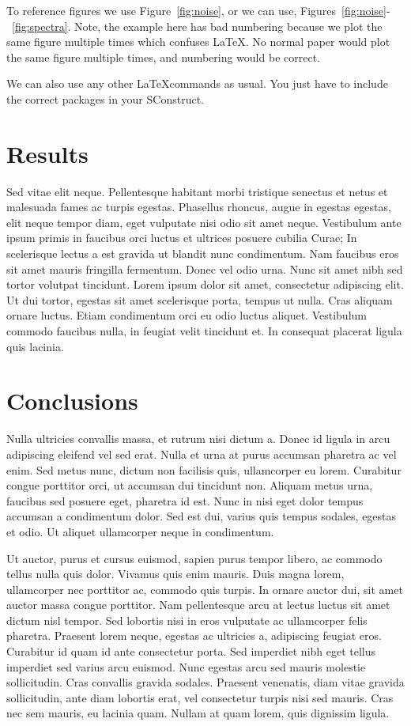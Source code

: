 To reference figures we use Figure~\ref{fig:noise}, or we can use, Figures~\ref{fig:noise}-~\ref{fig:spectra}. Note, the example here has bad numbering because we plot the same figure multiple times which confuses \LaTeX.  No normal paper would plot the same figure multiple times, and numbering would be correct.

We can also use any other \LaTeX commands as usual.  You just have to include the correct packages in your SConstruct.

\section{Results}

Sed vitae elit neque. Pellentesque habitant morbi tristique senectus et netus et malesuada fames ac turpis egestas. Phasellus rhoncus, augue in egestas egestas, elit neque tempor diam, eget vulputate nisi odio sit amet neque. Vestibulum ante ipsum primis in faucibus orci luctus et ultrices posuere cubilia Curae; In scelerisque lectus a est gravida ut blandit nunc condimentum. Nam faucibus eros sit amet mauris fringilla fermentum. Donec vel odio urna. Nunc sit amet nibh sed tortor volutpat tincidunt. Lorem ipsum dolor sit amet, consectetur adipiscing elit. Ut dui tortor, egestas sit amet scelerisque porta, tempus ut nulla. Cras aliquam ornare luctus. Etiam condimentum orci eu odio luctus aliquet. Vestibulum commodo faucibus nulla, in feugiat velit tincidunt et. In consequat placerat ligula quis lacinia.

\section{Conclusions}

Nulla ultricies convallis massa, et rutrum nisi dictum a. Donec id ligula in arcu adipiscing eleifend vel sed erat. Nulla et urna at purus accumsan pharetra ac vel enim. Sed metus nunc, dictum non facilisis quis, ullamcorper eu lorem. Curabitur congue porttitor orci, ut accumsan dui tincidunt non. Aliquam metus urna, faucibus sed posuere eget, pharetra id est. Nunc in nisi eget dolor tempus accumsan a condimentum dolor. Sed est dui, varius quis tempus sodales, egestas et odio. Ut aliquet ullamcorper neque in condimentum.

Ut auctor, purus et cursus euismod, sapien purus tempor libero, ac commodo tellus nulla quis dolor. Vivamus quis enim mauris. Duis magna lorem, ullamcorper nec porttitor ac, commodo quis turpis. In ornare auctor dui, sit amet auctor massa congue porttitor. Nam pellentesque arcu at lectus luctus sit amet dictum nisl tempor. Sed lobortis nisi in eros vulputate ac ullamcorper felis pharetra. Praesent lorem neque, egestas ac ultricies a, adipiscing feugiat eros. Curabitur id quam id ante consectetur porta. Sed imperdiet nibh eget tellus imperdiet sed varius arcu euismod. Nunc egestas arcu sed mauris molestie sollicitudin. Cras convallis gravida sodales. Praesent venenatis, diam vitae gravida sollicitudin, ante diam lobortis erat, vel consectetur turpis nisi sed mauris. Cras nec sem mauris, eu lacinia quam. Nullam at quam lorem, quis dignissim ligula.



